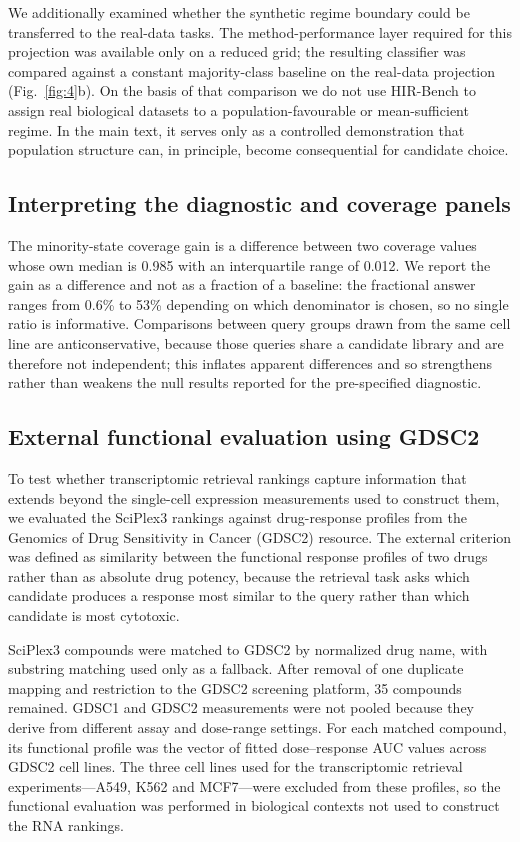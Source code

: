 \documentclass[11pt,letterpaper]{article}
\begin{document}
We additionally examined whether the synthetic regime boundary could be transferred to
the real-data tasks. The method-performance layer required for this projection was
available only on a reduced grid; the resulting classifier was compared against a
constant majority-class baseline on the real-data projection (Fig.~\ref{fig:4}b). On the
basis of that comparison we do not use HIR-Bench to assign real biological datasets to a
population-favourable or mean-sufficient regime. In the main text, it serves only as a controlled demonstration
that population structure can, in principle, become consequential for candidate choice.



\subsection*{Interpreting the diagnostic and coverage panels}
The minority-state coverage gain is a difference between two coverage values whose own median is
0.985 with an interquartile range of 0.012. We report the gain as a difference and not as a
fraction of a baseline: the fractional answer ranges from 0.6\% to 53\% depending on which
denominator is chosen, so no single ratio is informative. Comparisons between query groups drawn
from the same cell line are anticonservative, because those queries share a candidate library and
are therefore not independent; this inflates apparent differences and so strengthens rather than
weakens the null results reported for the pre-specified diagnostic.

\subsection*{External functional evaluation using GDSC2}

To test whether transcriptomic retrieval rankings capture information that extends beyond the
single-cell expression measurements used to construct them, we evaluated the SciPlex3 rankings
against drug-response profiles from the Genomics of Drug Sensitivity in Cancer (GDSC2) resource\cite{GDSC,GDSCLandscape}.
The external criterion was defined as similarity between the functional response profiles of two
drugs rather than as absolute drug potency, because the retrieval task asks which candidate produces
a response most similar to the query rather than which candidate is most cytotoxic.

SciPlex3 compounds were matched to GDSC2 by normalized drug name, with substring matching used
only as a fallback. After removal of one duplicate mapping and restriction to the GDSC2 screening
platform, 35 compounds remained. GDSC1 and GDSC2 measurements were not pooled because they derive
from different assay and dose-range settings. For each matched compound, its functional profile was
the vector of fitted dose--response AUC values across GDSC2 cell lines. The three cell lines used for
the transcriptomic retrieval experiments---A549, K562 and MCF7---were excluded from these profiles,
so the functional evaluation was performed in biological contexts not used to construct the RNA
rankings.
\end{document}
